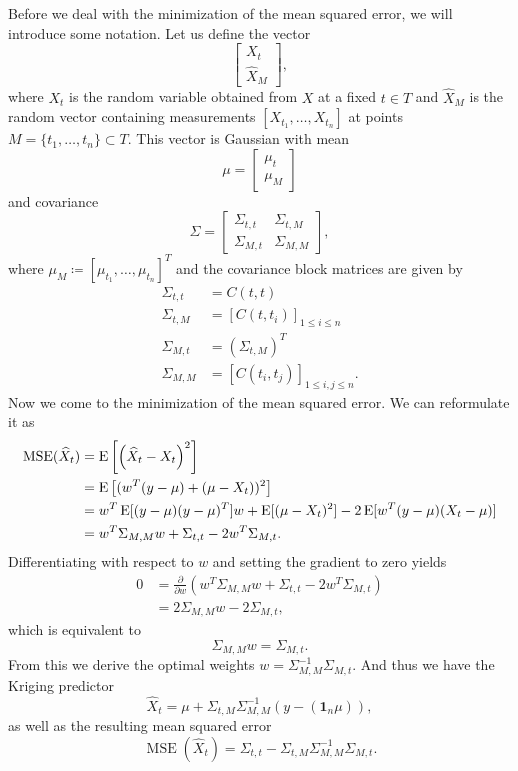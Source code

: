 Before we deal with the minimization of the mean squared error, we will introduce some notation.
Let us define the vector
\[
    \begin{bmatrix}
    X_{t}\\
    \hat{X}_{M}
    \end{bmatrix},
\]
where $X_{t}$ is the random variable obtained from $X$ at a fixed $t \in T$ and $\hat{X}_{M}$ is the random vector containing measurements \( [X_{t_{1}}, \dots, X_{t_{n}}] \) at points \(M=  \{ t_{1}, \dots, t_{n} \} \subset T \).
This vector is Gaussian with mean 
\[
    \mu = \begin{bmatrix}
    \mu_{t}\\
    \mu_{M}
    \end{bmatrix}
\]
and covariance
\[
    \Sigma = \begin{bmatrix}
    \Sigma_{t,t} & \Sigma_{t, M}\\
    \Sigma_{M, t} & \Sigma_{M,M}
    \end{bmatrix},
\]
where \( \mu_{M} \coloneqq [\mu_{t_{1}}, \dots , \mu_{t_{n}}]^{T} \) 
and the covariance block matrices are given by
\begin{align*}
    \Sigma_{t,t} &= C(t,t)\\
    \Sigma_{t, M} &= [C(t,t_{i})]_{1 \leq i \leq n}\\
    \Sigma_{M, t} &= (\Sigma_{t, M})^{T}\\
    \Sigma_{M,M} &= [C(t_{i},t_{j})]_{1 \leq i,j \leq n}.
\end{align*}
Now we come to the minimization of the mean squared error.
We can reformulate it as 
\begin{align*}
    \operatorname{MSE}(\widehat{X}_{t}) &= \operatorname*{E}\left[ \left( \widehat{X}_{t} - X_{t} \right)^{2} \right]\\
    &= \operatorname*{E}\left[ (w^{T}(y-\mu)+(\mu-X_{t}))^2 \right]\\
    &= w^{T} \operatorname*{E}[(y-\mu)(y-\mu)^{T}] w + \operatorname*{E}[(\mu-X_{t})^2] - 2 \operatorname*{E}[w^{T}(y-\mu)(X_{t}-\mu)]\\ 
    &= w^{T} \Sigma_{M, M} w + \Sigma_{t, t} -2 w^{T} \Sigma_{M,t}.
\end{align*}
Differentiating with respect to $w$ and setting the gradient to zero yields
\begin{align*}
    0 &= \frac{\partial}{\partial w} \left( w^{T}\Sigma_{M, M} w + \Sigma_{t, t} -2 w^{T}\Sigma_{M,t} \right) \\
    &= 2\Sigma_{M,M} w - 2 \Sigma_{M,t},
\end{align*}
which is equivalent to
\[
    \Sigma_{M,M} w = \Sigma_{M,t}.
\]
From this we derive the optimal weights \( w = \Sigma_{M,M}^{-1} \Sigma_{M,t} \).
And thus we have the Kriging predictor
\[
    \hat{X}_{t} = \mu + \Sigma_{t,M} \Sigma_{M,M}^{-1} (y-(\mathbf{1}_{n} \mu)),
\]
as well as the resulting mean squared error
\[
    \operatorname{MSE}(\hat{X}_{t}) = \Sigma_{t,t} - \Sigma_{t,M} \Sigma_{M,M}^{-1} \Sigma_{M,t}.
\]


